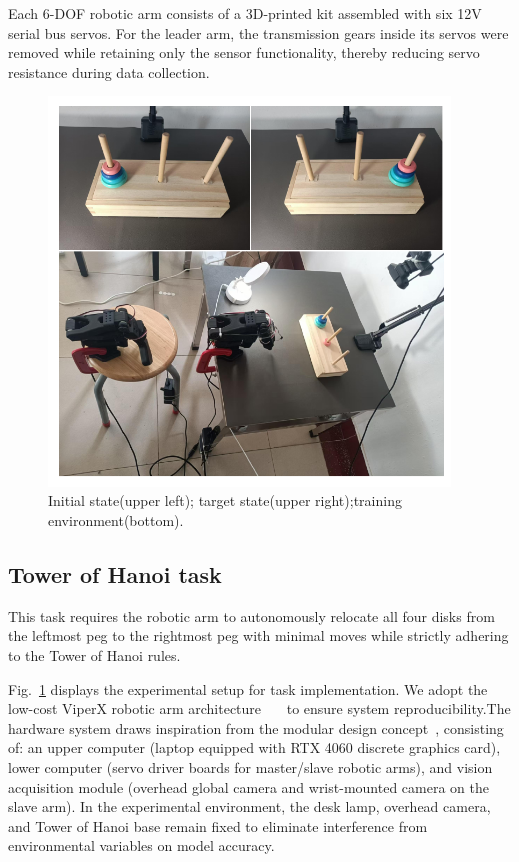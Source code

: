 \documentclass[runningheads]{llncs}
\begin{document}
\noindent Each 6-DOF robotic arm consists of a 3D-printed kit assembled with six 12V serial bus servos. For the leader arm, the transmission gears inside its servos were removed while retaining only the sensor functionality, thereby reducing servo resistance during data collection.


\begin{figure}
\centering
  \includegraphics[width=0.95\textwidth]{fig4.pdf}
  \caption{ Initial state(upper left); target state(upper right);training environment(bottom).} \label{fig2}
  \end{figure}

\subsection{Tower of Hanoi task}

This task requires the robotic arm to autonomously relocate all four disks from the leftmost peg to the rightmost peg with minimal moves while strictly adhering to the Tower of Hanoi rules.

Fig.~\ref{fig2} displays the experimental setup for task implementation. We adopt the low-cost ViperX robotic arm architecture~\cite{ref1}~\cite{ref2}~\cite{ref3} to ensure system reproducibility.The hardware system draws inspiration from the modular design concept~\cite{ref4}, consisting of: an upper computer (laptop equipped with RTX 4060 discrete graphics card), lower computer (servo driver boards for master/slave robotic arms), and vision acquisition module (overhead global camera and wrist-mounted camera on the slave arm). In the experimental environment, the desk lamp, overhead camera, and Tower of Hanoi base remain fixed to eliminate interference from environmental variables on model accuracy.
\end{document}
